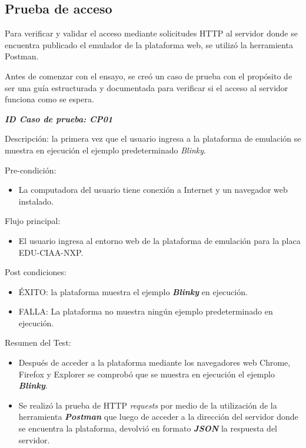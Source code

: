 \subsection{Prueba de acceso}    

Para verificar y validar el acceso mediante solicitudes HTTP al servidor donde se encuentra publicado el emulador de la plataforma web, se utilizó la herramienta Postman.

Antes de comenzar con el ensayo, se creó un caso de prueba con el propósito de ser una guía estructurada y documentada para verificar si el acceso al servidor funciona como se espera.


\textit{\textbf{ID Caso de prueba: CP01}}

Descripción: la primera vez que el usuario ingresa a la plataforma de emulación se muestra en ejecución el ejemplo predeterminado \textit{Blinky}.

Pre-condición: 
\begin{itemize}
	\item La computadora del usuario tiene conexión a Internet y un navegador web instalado.
\end{itemize}

Flujo principal:
\begin{itemize}
	\item El usuario ingresa al entorno web de la plataforma de emulación para la placa EDU-CIAA-NXP.
\end{itemize}
Post condiciones:
\begin{itemize}
	\item ÉXITO: la plataforma muestra el ejemplo \textit{\textbf{Blinky}} en ejecución.
	\item FALLA: La plataforma no muestra ningún ejemplo predeterminado en ejecución.
\end{itemize}

Resumen del Test:
\begin{itemize}
	\item Después de acceder a la plataforma mediante los navegadores web Chrome, Firefox y Explorer se comprobó que se muestra en ejecución el ejemplo \textit{\textbf{Blinky}}.
	\item Se realizó la prueba de HTTP \textit{requests} por medio de la utilización de la herramienta \textit{\textbf{Postman}} que luego de acceder a la dirección del servidor donde se encuentra la plataforma, devolvió en formato \textit{\textbf{JSON}} la respuesta del servidor.
\end{itemize}


